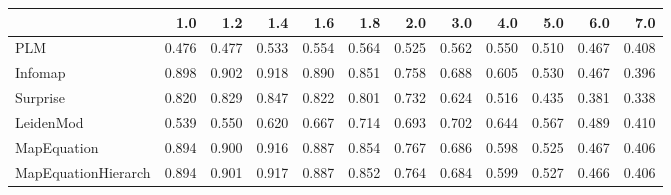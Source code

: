 \begin{tabular}{lrrrrrrrrrrr}
\toprule
{} &   1.0 &   1.2 &   1.4 &   1.6 &   1.8 &   2.0 &   3.0 &   4.0 &   5.0 &   6.0 &   7.0 \\
\midrule
PLM                 & 0.476 & 0.477 & 0.533 & 0.554 & 0.564 & 0.525 & 0.562 & 0.550 & 0.510 & 0.467 & 0.408 \\
Infomap             & 0.898 & 0.902 & 0.918 & 0.890 & 0.851 & 0.758 & 0.688 & 0.605 & 0.530 & 0.467 & 0.396 \\
Surprise            & 0.820 & 0.829 & 0.847 & 0.822 & 0.801 & 0.732 & 0.624 & 0.516 & 0.435 & 0.381 & 0.338 \\
LeidenMod           & 0.539 & 0.550 & 0.620 & 0.667 & 0.714 & 0.693 & 0.702 & 0.644 & 0.567 & 0.489 & 0.410 \\
MapEquation         & 0.894 & 0.900 & 0.916 & 0.887 & 0.854 & 0.767 & 0.686 & 0.598 & 0.525 & 0.467 & 0.406 \\
MapEquationHierarch & 0.894 & 0.901 & 0.917 & 0.887 & 0.852 & 0.764 & 0.684 & 0.599 & 0.527 & 0.466 & 0.406 \\
\bottomrule
\end{tabular}
